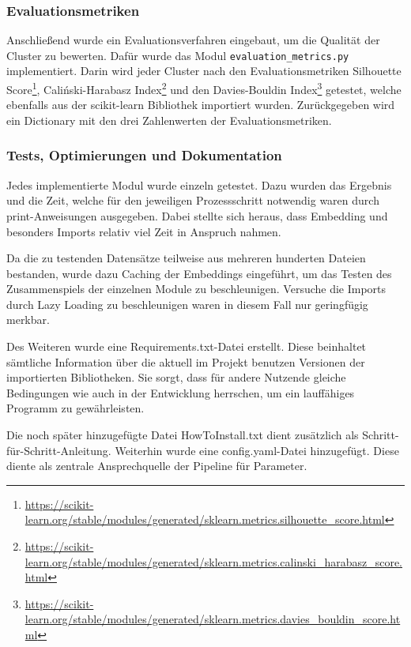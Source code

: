 \subsubsection*{Evaluationsmetriken}
Anschließend wurde ein Evaluationsverfahren eingebaut, um die Qualität der Cluster zu bewerten. Dafür wurde das Modul \texttt{evaluation\_metrics.py} implementiert. Darin wird jeder Cluster nach den Evaluationsmetriken Silhouette Score\footnote{\url{https://scikit-learn.org/stable/modules/generated/sklearn.metrics.silhouette_score.html}}, Caliński-Harabasz Index\footnote{\url{https://scikit-learn.org/stable/modules/generated/sklearn.metrics.calinski_harabasz_score.html}} und den Davies-Bouldin Index\footnote{\url{https://scikit-learn.org/stable/modules/generated/sklearn.metrics.davies_bouldin_score.html}} getestet, welche ebenfalls aus der scikit-learn Bibliothek importiert wurden. Zurückgegeben wird ein Dictionary mit den drei Zahlenwerten der Evaluationsmetriken.


\subsubsection*{Tests, Optimierungen und Dokumentation}
Jedes implementierte Modul wurde einzeln getestet. Dazu wurden das Ergebnis und die Zeit, welche für den jeweiligen Prozessschritt notwendig waren durch print-Anweisungen ausgegeben. Dabei stellte sich heraus, dass Embedding und besonders Imports relativ viel Zeit in Anspruch nahmen.

Da die zu testenden Datensätze teilweise aus mehreren hunderten Dateien bestanden, wurde dazu Caching der Embeddings eingeführt, um das Testen des Zusammenspiels der einzelnen Module zu beschleunigen. Versuche die Imports durch Lazy Loading zu beschleunigen waren in diesem Fall nur geringfügig merkbar.

Des Weiteren wurde eine Requirements.txt-Datei erstellt. Diese beinhaltet sämtliche Information über die aktuell im Projekt benutzen Versionen der importierten Bibliotheken. Sie sorgt, dass für andere Nutzende gleiche Bedingungen wie auch in der Entwicklung herrschen, um ein lauffähiges Programm zu gewährleisten.

Die noch später hinzugefügte Datei HowToInstall.txt dient zusätzlich als Schritt-für-Schritt-Anleitung. Weiterhin wurde eine config.yaml-Datei hinzugefügt. Diese diente als zentrale Ansprechquelle der Pipeline für Parameter.


